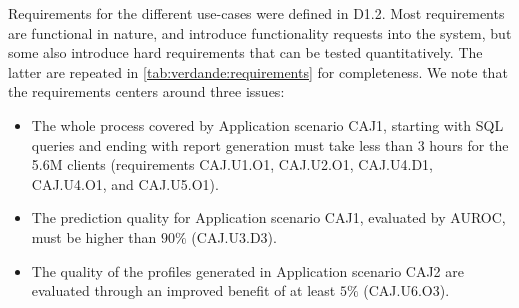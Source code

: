 \documentclass{article}
\theoremstyle{theorem}
\theoremstyle{definition}
\begin{document}
Requirements for the different use-cases were defined in D1.2. Most requirements are functional in nature, and introduce functionality requests into the system, but some also introduce hard requirements that can be tested quantitatively. The latter are repeated in \ref{tab:verdande:requirements} for completeness. We note that the requirements centers around three issues:
\begin{itemize}
\item The whole process covered by Application scenario CAJ1, starting with SQL queries and ending with report generation must take less than 3 hours for the 5.6M clients (requirements CAJ.U1.O1, CAJ.U2.O1, CAJ.U4.D1, CAJ.U4.O1, and CAJ.U5.O1).
\item The prediction quality for Application scenario CAJ1, evaluated by AUROC, must be higher than $90\%$ (CAJ.U3.D3).
\item The quality of the profiles generated in Application scenario CAJ2 are evaluated through an improved benefit of at least $5\%$ (CAJ.U6.O3).
\end{itemize}
\end{document}
